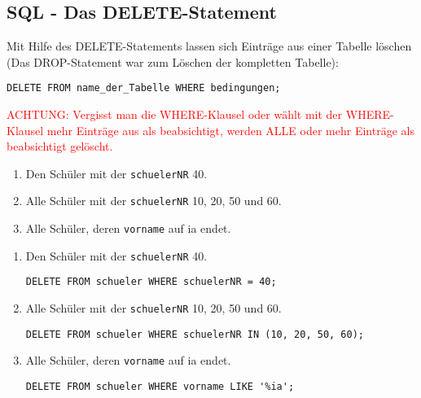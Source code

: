 \subsection[DELETE-Statement]{SQL - Das DELETE-Statement}\label{delete}
Mit Hilfe des DELETE-Statements lassen sich Einträge aus einer Tabelle löschen (Das DROP-Statement war zum Löschen der kompletten Tabelle):
\begin{tcolorbox}[title=DELETE-Statement]
	\lstinline!DELETE FROM name_der_Tabelle WHERE bedingungen;!
\end{tcolorbox}
\textcolor{red}{ACHTUNG: Vergisst man die WHERE-Klausel oder wählt mit der WHERE-Klausel mehr Einträge aus als beabsichtigt, werden ALLE oder mehr Einträge als beabsichtigt gelöscht.}

\begin{Exercise}[title={Lösche folgende Einträge aus der Datenbank:}, label=Delete]
	\begin{enumerate}
		\item Den Schüler mit der \lstinline!schuelerNR! 40.
		\item Alle Schüler mit der \lstinline!schuelerNR! 10, 20, 50 und 60.
		\item Alle Schüler, deren \lstinline!vorname! auf ia endet.
	\end{enumerate}
\end{Exercise}
\begin{Answer}[ref=Delete]
	\begin{enumerate}
		\item Den Schüler mit der \lstinline!schuelerNR! 40.

		\lstinline!DELETE FROM schueler WHERE schuelerNR = 40;!
		\item Alle Schüler mit der \lstinline!schuelerNR! 10, 20, 50 und 60.

		\lstinline!DELETE FROM schueler WHERE schuelerNR IN (10, 20, 50, 60);!
		\item Alle Schüler, deren \lstinline!vorname! auf ia endet.

		\lstinline!DELETE FROM schueler WHERE vorname LIKE '%ia';!
	\end{enumerate}
\end{Answer}